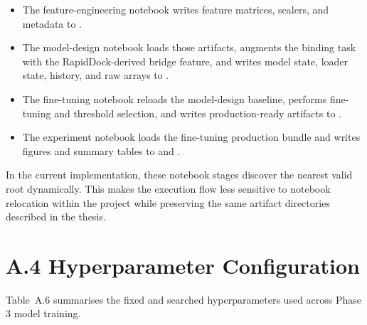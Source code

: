 \documentclass[a4paper,11pt,twoside]{report}
\begin{document}
\begin{itemize}
\item The feature-engineering notebook writes feature matrices, scalers, and metadata to .
\item The model-design notebook loads those artifacts, augments the binding task with the RapidDock-derived bridge feature, and writes model state, loader state, history, and raw arrays to .
\item The fine-tuning notebook reloads the model-design baseline, performs fine-tuning and threshold selection, and writes production-ready artifacts to .
\item The experiment notebook loads the fine-tuning production bundle and writes figures and summary tables to  and .
\end{itemize}

\noindent In the current implementation, these notebook stages discover the nearest valid  root dynamically. This makes the execution flow less sensitive to notebook relocation within the project while preserving the same artifact directories described in the thesis.

\section*{A.4 Hyperparameter Configuration}

Table~A.6 summarises the fixed and searched hyperparameters used across Phase 3 model training.
\end{document}

